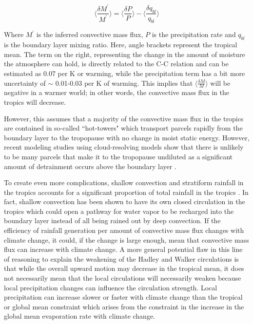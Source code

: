 \documentclass[letterpaper,12pt,titlepage,oneside,final]{book}
\begin{document}
\begin{equation}\label{eq:HS}
\Bigg\langle\frac{\delta{M^{'}}}{M^{'}}\Bigg\rangle=\Bigg\langle\frac{\delta{P}}{P}\Bigg\rangle-\Bigg\langle\frac{\delta{q_{bl}}}{q_{bl}}\Bigg\rangle
\end{equation}

Where $M^{'}$ is the inferred convective mass flux, $P$ is the precipitation rate and $q_{bl}$ is the boundary layer mixing ratio. Here, angle brackets represent the tropical mean. The term on the right, representing the change in the amount of moisture the atmosphere can hold, is directly related to the C-C relation and can be estimated as 0.07 per K or warming, while the precipitation term has a bit more uncertainty of $\sim$ 0.01-0.03 per K of warming. This implies that $\langle\frac{\delta{M}}{M}\rangle$ will be negative in a warmer world; in other words, the convective mass flux in the tropics will decrease. 

However, this assumes that a majority of the convective mass flux in the tropics are contained in so-called ``hot-towers" \cite{riehl_and_malkus_heat_1958} which transport parcels rapidly from the boundary layer to the tropopause with no change in moist static energy. However, recent modeling studies using cloud-resolving models show that there is unlikely to be many parcels that make it to the tropopause undiluted \cite{romps_undiluted_2010} as a significant amount of detrainment occurs above the boundary layer \cite{romps_direct_2010}. 

To create even more complications, shallow convection and stratiform rainfall in the tropics accounts for a significant proportion of total rainfall in the tropics \cite{schumacher_stratiform_2003}. In fact, shallow convection has been shown to have its own closed circulation in the tropics \cite{folkins_ian_low-level_2008} which could open a pathway for water vapor to be recharged into the boundary layer instead of all being rained out by deep convection. If the efficiency of rainfall generation per amount of convective mass flux changes with climate change, it could, if the change is large enough, mean that convective mass flux can increase with climate change. A more general potential flaw in this line of reasoning to explain the weakening of the Hadley and Walker circulations is that while the overall upward motion may decrease in the tropical mean, it does not necessarily mean that the local circulations will necessarily weaken \cite{merlis_changes_2011} because local precipitation changes can influence the circulation strength. Local precipitation can increase slower or faster with climate change than the tropical or global mean constraint which arises from the constraint in the increase in the global mean evaporation rate with climate change. 
\end{document}

